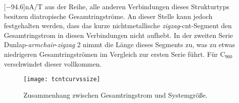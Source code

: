 \unit[$-$94.6]{nA/T} aus der Reihe, alle anderen Verbindungen dieses Strukturtyps besitzen diatropische Gesamtringströme. An dieser Stelle kann jedoch festgehalten werden, dass das kurze nichtmetallische \textit{zigzag}-\ac{cnt}-Segment den Gesamtringstrom in diesen Verbindungen nicht aufhebt. In der zweiten Serie \glqq Dunlap-\textit{armchair}-\textit{zigzag} 2\grqq{} nimmt die Länge dieses Segments zu, was zu etwas niedrigeren Gesamtringströmen im Vergleich zur ersten Serie führt. Für C$_{960}$ verschwindet dieser vollkommen. \\

\begin{figure}[ht!]
	\centering
	\texttt{[image: tcntcurvssize]}
	\captionsetup{figurewithin = chapter}
	\captionsetup{font=small, labelfont=bf}\caption[Zusammenhang zwischen Gesamtringstrom und Systemgröße]{Zusammenhang zwischen Gesamtringstrom und Systemgröße.}
\label{abb:tcntcurvssize}
\end{figure}

